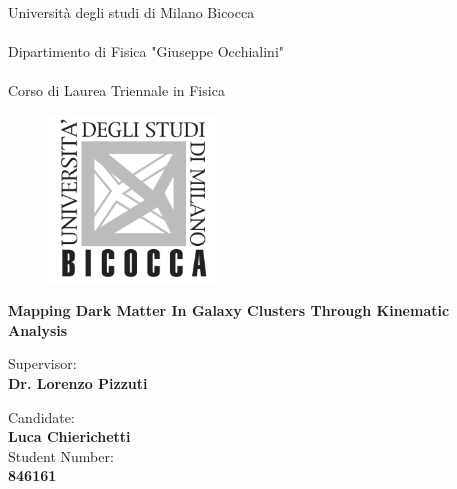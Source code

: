 

\begin{titlepage}

\begin{center}
    {\LARGE{Università degli studi di Milano Bicocca}}\\
    {\hspace{1cm}}\\
    {\small{Dipartimento di Fisica "Giuseppe Occhialini"}}\\
    {\hspace{1cm}}\\
    {\small{Corso di Laurea Triennale in Fisica}}
\end{center}

\vspace{0.2cm}

\begin{figure}[H]
    \centering
    \includegraphics[width=0.4\textwidth]{stuff/logo.png}
\end{figure}

\vspace{0.5cm}


\begin{center}
    {\textbf{\LARGE {Mapping Dark Matter In Galaxy Clusters Through Kinematic Analysis}}} \\ \vspace{0.4cm}
    {\textbf{\large {}}}
\end{center}

\vspace{1.8cm}

\begin{minipage}[t]{0.47\textwidth}
	{Supervisor:\\ \large{\bf Dr. Lorenzo Pizzuti}}
	\vspace{0.5cm}
\end{minipage}
\hfill\begin{minipage}[t]{0.47\textwidth}\raggedleft
	{Candidate:\\ \large{\bf Luca Chierichetti}}
	\vspace{0.5cm}
	{\\Student Number: \\\large{\bf 846161}}
\end{minipage}

\vspace{30mm}

\end{titlepage}

\restoregeometry

\clearpage %
\begingroup
  \pagestyle{empty}
  \null
  \newpage
\endgroup

